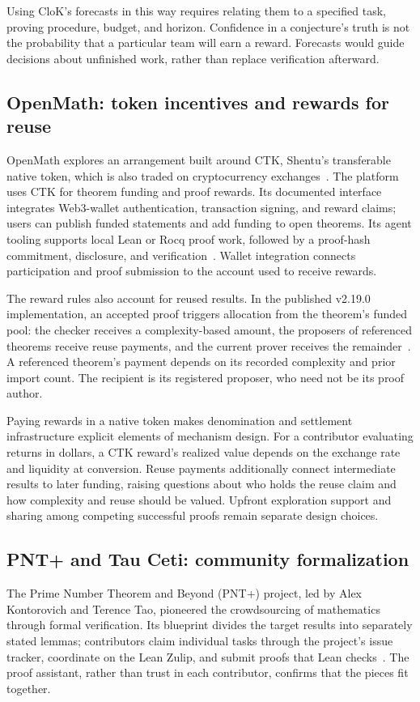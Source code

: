 \documentclass[11pt,a4paper,reqno]{amsart}
\numberwithin{equation}{section}
\begin{document}
Using CloK's forecasts in this way requires relating them to a specified task, proving procedure, budget, and horizon. Confidence in a conjecture's truth is not the probability that a particular team will earn a reward. Forecasts would guide decisions about unfinished work, rather than replace verification afterward.

\subsection{OpenMath: token incentives and rewards for reuse}
OpenMath explores an arrangement built around CTK, Shentu's transferable native token, which is also traded on cryptocurrency exchanges~\cite{shentutoken,ctkmarket}. The platform uses CTK for theorem funding and proof rewards. Its documented interface integrates Web3-wallet authentication, transaction signing, and reward claims; users can publish funded statements and add funding to open theorems. Its agent tooling supports local Lean or Rocq proof work, followed by a proof-hash commitment, disclosure, and verification~\cite{openmath}. Wallet integration connects participation and proof submission to the account used to receive rewards.

The reward rules also account for reused results. In the published v2.19.0 implementation, an accepted proof triggers allocation from the theorem's funded pool: the checker receives a complexity-based amount, the proposers of referenced theorems receive reuse payments, and the current prover receives the remainder~\cite{openmathprotocol}. A referenced theorem's payment depends on its recorded complexity and prior import count. The recipient is its registered proposer, who need not be its proof author.

Paying rewards in a native token makes denomination and settlement infrastructure explicit elements of mechanism design. For a contributor evaluating returns in dollars, a CTK reward's realized value depends on the exchange rate and liquidity at conversion. Reuse payments additionally connect intermediate results to later funding, raising questions about who holds the reuse claim and how complexity and reuse should be valued. Upfront exploration support and sharing among competing successful proofs remain separate design choices.

\subsection{PNT+ and Tau Ceti: community formalization}
The Prime Number Theorem and Beyond (PNT+) project, led by Alex Kontorovich and Terence Tao, pioneered the crowdsourcing of mathematics through formal verification. Its blueprint divides the target results into separately stated lemmas; contributors claim individual tasks through the project's issue tracker, coordinate on the Lean Zulip, and submit proofs that Lean checks~\cite{pnt}. The proof assistant, rather than trust in each contributor, confirms that the pieces fit together.
\end{document}
